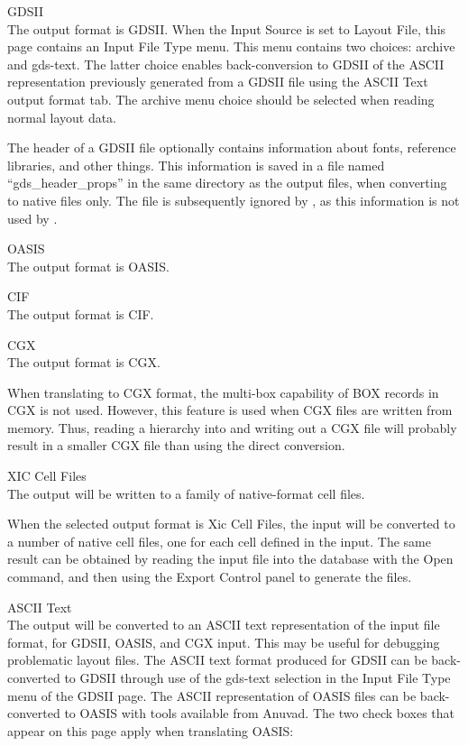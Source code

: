 \begin{description}
\item{\cb GDSII}\\
The output format is GDSII.  When the {\cb Input Source} is set to
{\cb Layout File}, this page contains an {\cb Input File Type} menu. 
This menu contains two choices:  {\cb archive} and {\cb gds-text}. 
The latter choice enables back-conversion to GDSII of the ASCII
representation previously generated from a GDSII file using the {\cb
ASCII Text} output format tab.  The {\cb archive} menu choice should
be selected when reading normal layout data.

The header of a GDSII file optionally contains information about
fonts, reference libraries, and other things.  This information is
saved in a file named ``{\vt gds\_header\_props}'' in the same
directory as the output files, when converting to native files only. 
The file is subsequently ignored by {\Xic}, as this information is not
used by {\Xic}.

\item{\cb OASIS}\\
The output format is OASIS.

\item{\cb CIF}\\
The output format is CIF.

\item{\cb CGX}\\
The output format is CGX.

When translating to CGX format, the multi-box capability of BOX
records in CGX is not used.  However, this feature is used when CGX
files are written from memory.  Thus, reading a hierarchy into {\Xic}
and writing out a CGX file will probably result in a smaller CGX file
than using the direct conversion.

\item{\cb XIC Cell Files}\\
The output will be written to a family of native-format cell files.

When the selected output format is {\cb Xic Cell Files}, the input
will be converted to a number of native cell files, one for each
cell defined in the input.  The same result can be obtained by reading
the input file into the database with the {\cb Open} command, and then
using the {\cb Export Control} panel to generate the {\Xic} files.

\item{\cb ASCII Text}\\
The output will be converted to an ASCII text representation of the
input file format, for GDSII, OASIS, and CGX input.  This may be
useful for debugging problematic layout files.  The ASCII text format
produced for GDSII can be back-converted to GDSII through use of the
{\cb gds-text} selection in the {\cb Input File Type} menu of the {\cb
GDSII} page.  The ASCII representation of OASIS files can be
back-converted to OASIS with tools available from Anuvad.  The two
check boxes that appear on this page apply when translating OASIS:


\end{description}
